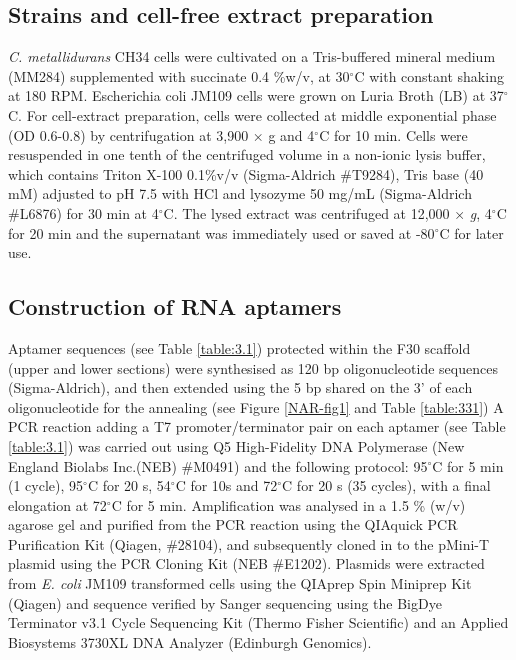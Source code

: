 \subsection*{Strains and cell-free extract preparation}

\textit{C. metallidurans} CH34 cells were cultivated on a Tris-buffered mineral medium (MM284) \citep{mergeay1985alcaligenes} supplemented with succinate 0.4 \%w/v, at 30$^{\circ}$C with constant shaking at 180 RPM. Escherichia coli JM109 cells were grown on Luria Broth (LB) at 37$^{\circ}$C. For cell-extract preparation, cells were collected at middle exponential phase (OD 0.6-0.8) by centrifugation at 3,900 × g and 4$^{\circ}$C for 10 min. Cells were resuspended in one tenth of the centrifuged volume in a non-ionic lysis buffer, which contains Triton X-100 0.1\%v/v (Sigma-Aldrich \#T9284), Tris base (40 mM) adjusted to pH 7.5 with HCl and lysozyme 50 mg/mL (Sigma-Aldrich \#L6876) for 30 min at 4$^{\circ}$C. The lysed extract was centrifuged at 12,000 × \textit{g}, 4$^{\circ}$C for 20 min and the supernatant was immediately used or saved at -80$^{\circ}$C for later use.

\subsection*{Construction of RNA aptamers}

Aptamer sequences (see Table \ref{table:3.1}) protected within the F30 scaffold (upper and lower sections) were synthesised as 120 bp oligonucleotide sequences (Sigma-Aldrich), and then extended using the 5 bp shared on the 3’ of each oligonucleotide for the annealing (see Figure \ref{NAR-fig1} and Table \ref{table:331}) A PCR reaction adding a T7 promoter/terminator pair on each aptamer (see Table \ref{table:3.1}) was carried out using Q5 High-Fidelity DNA Polymerase (New England Biolabs Inc.(NEB) \#M0491) and the following protocol: 95$^{\circ}$C for 5 min (1 cycle), 95$^{\circ}$C for 20 s, 54$^{\circ}$C for 10s and 72$^{\circ}$C for 20 s (35 cycles), with a final elongation at 72$^{\circ}$C for 5 min. Amplification was analysed in a 1.5 \% (w/v) agarose gel and purified from the PCR reaction using the QIAquick PCR Purification Kit (Qiagen, \#28104), and subsequently cloned in to the pMini-T plasmid using the PCR Cloning Kit (NEB \#E1202). Plasmids were extracted from \textit{E. coli} JM109 transformed cells using the QIAprep Spin Miniprep Kit (Qiagen) and sequence verified by Sanger sequencing using the BigDye Terminator v3.1 Cycle Sequencing Kit (Thermo Fisher Scientific) and an Applied Biosystems 3730XL DNA Analyzer (Edinburgh Genomics). 

